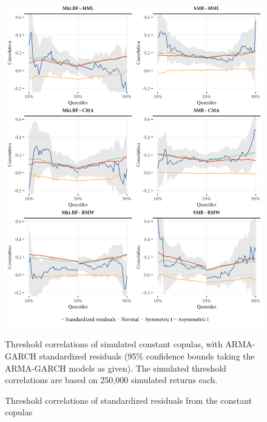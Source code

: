 \begin{figure}[!ht]
  \centering
  \includegraphics[scale=1]{graphics/threshold_simulated_1.png}  
  \footnotesize
  \caption{Threshold correlations of standardized residuals from the constant copulas}
  \begin{longcaption}
    Threshold correlations of simulated constant copulas, with ARMA-GARCH standardized residuals (95\% confidence bounds taking the ARMA-GARCH models as given). The simulated threshold correlations are based on 250,000 simulated returns each.
  \end{longcaption}
  \label{fig:threshold_simulated1}
\end{figure}
\pagebreak
